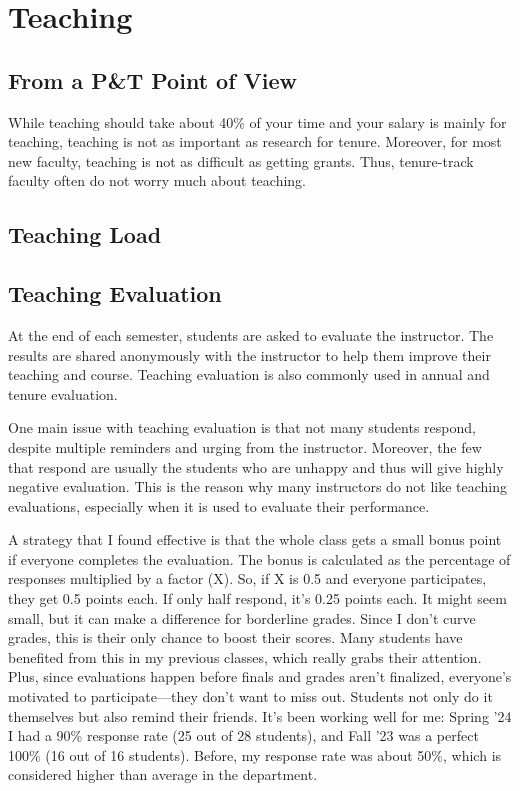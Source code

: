 \documentclass[oneside,11pt,dvipsnames]{book}
\begin{document}
\chapter{Teaching}

\section{From a P\&T Point of View}

While teaching should take about 40\% of your time and your salary is mainly for teaching, teaching is not as important as research for tenure.  Moreover, for most new faculty, teaching is not as difficult as getting grants. Thus, tenure-track faculty often do not worry much about teaching. 

\section{Teaching Load}
\section{Teaching Evaluation}

At the end of each semester, students are asked to evaluate the instructor. The results are shared anonymously with the instructor to help them improve their teaching and course. Teaching evaluation is also commonly used in annual and tenure evaluation.

One main issue with teaching evaluation is that not many students respond, despite multiple reminders and urging from the instructor.  Moreover, the few that respond are usually the students who are unhappy and thus will give highly negative evaluation. This is the reason why many instructors do not like teaching evaluations, especially when it is used to evaluate their performance.


A strategy that I found effective is that the whole class gets a small bonus point if everyone completes the evaluation. The bonus is calculated as the percentage of responses multiplied by a factor (X). So, if X is 0.5 and everyone participates, they get 0.5 points each. If only half respond, it's 0.25 points each. It might seem small, but it can make a difference for borderline grades. Since I don't curve grades, this is their only chance to boost their scores. Many students have benefited from this in my previous classes, which really grabs their attention. Plus, since evaluations happen before finals and grades aren't finalized, everyone's motivated to participate—they don't want to miss out. Students not only do it themselves but also remind their friends. It's been working well for me: Spring '24 I had a 90\% response rate (25 out of 28 students), and Fall '23 was a perfect 100\% (16 out of 16 students). Before, my response rate was about 50\%, which is considered higher than average in the department.
\end{document}
